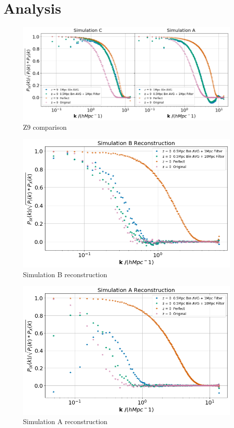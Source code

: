 \section{Analysis}


\begin{figure}
    \centering
    \includegraphics[width=1\columnwidth]{images/realRecon/z9SimComp.png}%
    
    \caption{
        Z9 comparison
    }
    
    \label{fig:10}
\end{figure}

\begin{figure}
    \centering
    \includegraphics[width=1\columnwidth]{images/realRecon/simBRecon.png}%
    
    \caption{
        Simulation B reconstruction
    }
    
    \label{fig:11}
\end{figure}

\begin{figure}
    \centering
    \includegraphics[width=1\columnwidth]{images/realRecon/simARecon.png}%
    
    \caption{
        Simulation A reconstruction
    }
    
    \label{fig:12}
\end{figure}